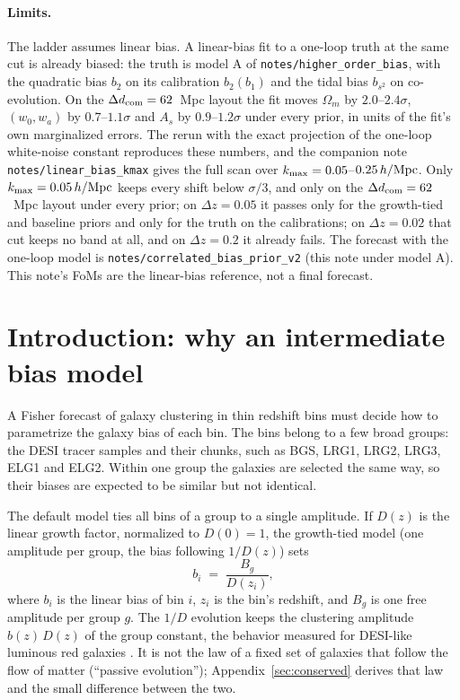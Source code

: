 \documentclass[11pt]{article}
\begin{document}
\paragraph{Limits.}
The ladder assumes linear bias.  A linear-bias fit to a one-loop
truth at the same cut is already biased: the truth is model A of
\texttt{notes/higher\_order\_bias}, with the quadratic bias $b_2$ on
its calibration $b_2(b_1)$ and the tidal bias $b_{s^2}$ on
co-evolution.  On the $\Delta d_{\rm com} = 62$~Mpc layout the fit
moves $\Omega_m$ by $2.0$--$2.4\sigma$, $(w_0, w_a)$ by
$0.7$--$1.1\sigma$ and $A_s$ by $0.9$--$1.2\sigma$ under every prior,
in units of the fit's own marginalized errors.  The rerun with the
exact projection of the one-loop white-noise constant reproduces
these numbers, and the companion note
\texttt{notes/linear\_bias\_kmax} gives the full scan over
$k_{\rm max} = 0.05$--$0.25\,h/{\rm Mpc}$.  Only
$k_{\rm max} = 0.05\,h/{\rm Mpc}$ keeps every shift below $\sigma/3$,
and only on the $\Delta d_{\rm com} = 62$~Mpc layout under every prior;
on $\Delta z = 0.05$ it passes only for the growth-tied and baseline
priors
and only for the truth on the calibrations; on $\Delta z = 0.02$ that
cut keeps no band at all, and on $\Delta z = 0.2$ it already fails.
The forecast with the one-loop model is
\texttt{notes/correlated\_bias\_prior\_v2} (this note under model A).
This note's FoMs are the linear-bias reference, not a final forecast.

\clearpage

\appendix

\section{Introduction: why an intermediate bias model}
\label{sec:intro}

A Fisher forecast of galaxy clustering in thin redshift bins must decide
how to parametrize the galaxy bias of each bin.  The bins belong to a few
broad groups: the DESI tracer samples and their chunks, such as BGS,
LRG1, LRG2, LRG3, ELG1 and ELG2.  Within one group the galaxies are
selected the same way, so their biases are expected to be similar but not
identical.

The default model ties all bins of a group to a single amplitude.  If
$D(z)$ is the linear growth factor, normalized to $D(0) = 1$, the
growth-tied model (one amplitude per group, the bias following
$1/D(z)$) sets
\begin{equation}
  b_i \;=\; \frac{B_g}{D(z_i)},
  \label{eq:tied}
\end{equation}
where $b_i$ is the linear bias of bin $i$, $z_i$ is the bin's redshift,
and $B_g$ is one free amplitude per group $g$.  The $1/D$ evolution keeps
the clustering amplitude $b(z)\,D(z)$ of the group constant, the
behavior measured for DESI-like luminous red galaxies
\cite{Zhou2021}.  It is not the law of a fixed set of galaxies that
follow the flow of matter (``passive evolution'');
Appendix~\ref{sec:conserved} derives that law and the small
difference between the two.
\end{document}
